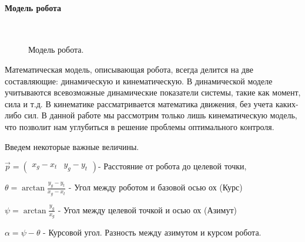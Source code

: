 \documentclass[12pt,a4paper,openany]{extarticle}
\begin{document}
\paragraph*{Модель робота}$\phantom{-}$\\
\begin{figure}[h!]
	\vspace{1cm}
	\caption{Модель робота.}
	\label{fig:model}
\end{figure}

\hspace*{\parindent} Математическая модель, описывающая робота, всегда делится на две составляющие: динамическую и кинематическую. В динамической моделе учитываются всевозможные динамические показатели системы, такие как момент, сила и т.д. В кинематике рассматривается математика движения, без учета каких-либо сил. В данной работе мы рассмотрим только лишь кинематическую модель, что позволит нам углубиться в решение проблемы оптимального контроля.


Введем некоторые важные величины.
 
$\vec{p} = \begin{pmatrix}x_g - x_t & y_g - y_t\end{pmatrix}$- Расстояние от робота до целевой точки,

$\theta  = \arctan \frac{y_g - y_t}{x_g - x_t}$ - Угол между роботом и базовой осью ох (Курс)

$\psi = \arctan \frac{y_g}{x_g}$ - Угол между целевой точкой и осью ох (Азимут)

$\alpha = \psi - \theta$ - Курсовой угол. Разность между азимутом и курсом робота.
\end{document}

